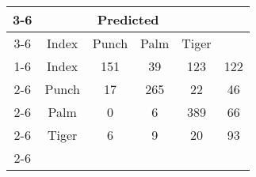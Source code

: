 \documentclass{standalone}
\begin{document}
 
 \begin{tabular}{|c |c |c |c |c |c |}
\cline{3-6}\multicolumn{2}{c|}{} & \multicolumn{4}{c|}{Predicted} \\ 
\cline{3-6} \multicolumn{2}{c |}{ } & Index & Punch & Palm & Tiger\\ 
\cline{1-6}\multirow{4}{*}{\rotatebox[origin=c]{90}{Actual}} & Index & 151 & 39 & 123 & 122\\ 
 \cline{2-6} & Punch & 17 & 265 & 22 & 46\\ 
 \cline{2-6} & Palm & 0 & 6 & 389 & 66\\ 
 \cline{2-6} & Tiger & 6 & 9 & 20 & 93\\ 
 \cline{2-6}\hline \end{tabular}
 
\end{document}
